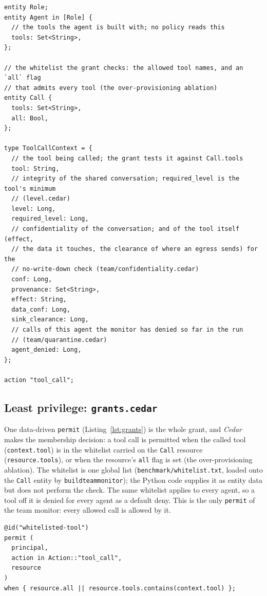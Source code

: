 \documentclass[11pt,a4paper]{article}
\DeclareRobustCommand{\code}[1]{{\renewcommand{\_}{\textunderscore\allowbreak}\texttt{#1}}}
\begin{document}
\begin{lstlisting}[style=cedar,caption={Team schema core (\texttt{engine/policies/team.core.cedarschema}; field comments added here for reference)},label={lst:schemacore}]
entity Role;
entity Agent in [Role] {
  // the tools the agent is built with; no policy reads this
  tools: Set<String>,
};

// the whitelist the grant checks: the allowed tool names, and an `all` flag
// that admits every tool (the over-provisioning ablation)
entity Call {
  tools: Set<String>,
  all: Bool,
};

type ToolCallContext = {
  // the tool being called; the grant tests it against Call.tools
  tool: String,
  // integrity of the shared conversation; required_level is the tool's minimum
  // (level.cedar)
  level: Long,
  required_level: Long,
  // confidentiality of the conversation; and of the tool itself (effect,
  // the data it touches, the clearance of where an egress sends) for the
  // no-write-down check (team/confidentiality.cedar)
  conf: Long,
  provenance: Set<String>,
  effect: String,
  data_conf: Long,
  sink_clearance: Long,
  // calls of this agent the monitor has denied so far in the run
  // (team/quarantine.cedar)
  agent_denied: Long,
};

action "tool_call";
\end{lstlisting}

\subsection{Least privilege: \code{grants.cedar}}
\label{sec:grants}

One data-driven \code{permit} (Listing~\ref{lst:grants}) is the whole grant, and
\emph{Cedar} makes the membership decision: a tool call is permitted when the called tool
(\code{context.tool}) is in the whitelist carried on the \code{Call} resource
(\code{resource.tools}), or when the resource's \code{all} flag is set (the
over-provisioning ablation). The whitelist is one global list (\code{benchmark/whitelist.txt},
loaded onto the \code{Call} entity by \code{build\_team\_monitor}); the Python code supplies
it as entity data but does not perform the check. The same whitelist applies to every
agent, so a tool off it is denied for every agent as a default deny. This is the only
\code{permit} of the team monitor: every allowed call is allowed by it.

\begin{lstlisting}[style=cedar,caption={Grant policy (\texttt{engine/policies/grants.cedar})},label={lst:grants}]
@id("whitelisted-tool")
permit (
  principal,
  action in Action::"tool_call",
  resource
)
when { resource.all || resource.tools.contains(context.tool) };
\end{lstlisting}
\end{document}
